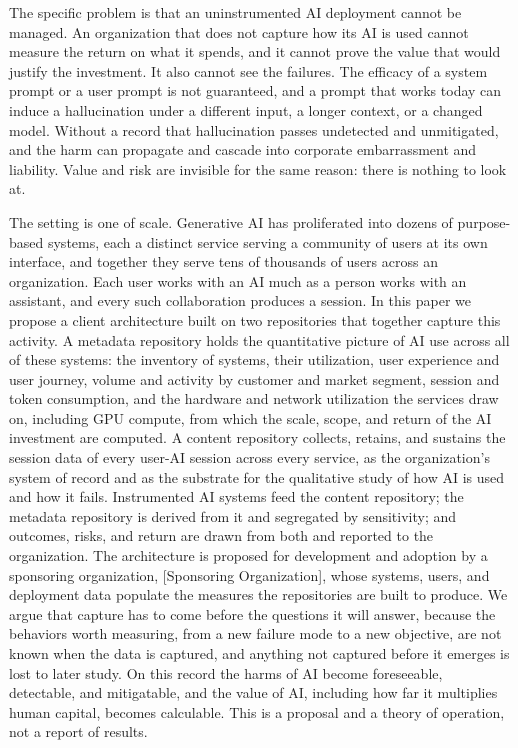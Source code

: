 \documentclass[11pt]{article}
\newcommand{\sponsor}{[Sponsoring Organization]}
\begin{document}
The specific problem is that an uninstrumented AI deployment cannot be managed. An
organization that does not capture how its AI is used cannot measure the return on
what it spends, and it cannot prove the value that would justify the investment. It
also cannot see the failures. The efficacy of a system prompt or a user prompt is
not guaranteed, and a prompt that works today can induce a hallucination under a
different input, a longer context, or a changed model. Without a record that
hallucination passes undetected and unmitigated, and the harm can propagate and
cascade into corporate embarrassment and liability. Value and risk are invisible
for the same reason: there is nothing to look at.

The setting is one of scale. Generative AI has proliferated into dozens of
purpose-based systems, each a distinct service serving a community of users at its
own interface, and together they serve tens of thousands of users across an
organization. Each user works with an AI much as a person works with an assistant,
and every such collaboration produces a session. In this paper we propose a client
architecture built on two repositories that together capture this activity. A
metadata repository holds the quantitative picture of AI use across all of these
systems: the inventory of systems, their utilization, user experience and user
journey, volume and activity by customer and market segment, session and token
consumption, and the hardware and network utilization the services draw on,
including GPU compute, from which the scale, scope, and return of the AI investment
are computed. A content repository collects, retains, and sustains the session data
of every user-AI session across every service, as the organization's system of
record and as the substrate for the qualitative study of how AI is used and how it
fails. Instrumented AI systems feed the content repository; the metadata repository
is derived from it and segregated by sensitivity; and outcomes, risks, and return
are drawn from both and reported to the organization. The architecture is proposed
for development and adoption by a sponsoring organization, \sponsor{}, whose
systems, users, and deployment data populate the measures the repositories are
built to produce. We argue
that capture has to come before the questions it will answer, because the
behaviors worth measuring, from a new failure mode to a new objective, are not
known when the data is captured, and anything not captured before it emerges is
lost to later study. On this record the harms of AI become foreseeable,
detectable, and mitigatable, and the value of AI, including how far it multiplies
human capital, becomes calculable. This is a proposal and a theory of operation,
not a report of results.
\end{document}
